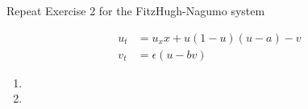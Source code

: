 Repeat Exercise 2 for the FitzHugh-Nagumo system

\begin{align*}
    u_t &= u_x x + u (1 - u)(u - a) - v \\
    v_t &= \epsilon (u - b v)
\end{align*}

\begin{enumerate}
    \item 
    \pagebreak
    \item 
\end{enumerate}